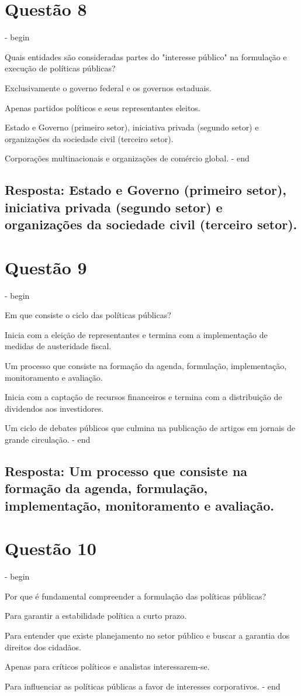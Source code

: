 \documentclass[
   article,       
   12pt,          
   oneside,       
   a4paper,       
   english,       
   brazil,        
   sumario=tradicional
   ]{abntex2}
\begin{document}
\section{Questão 8}
\itemize - begin
\item Quais entidades são consideradas partes do "interesse público" na formulação e execução de políticas públicas?
\item Exclusivamente o governo federal e os governos estaduais.
\item Apenas partidos políticos e seus representantes eleitos.
\item Estado e Governo (primeiro setor), iniciativa privada (segundo setor) e organizações da sociedade civil (terceiro setor).
\item Corporações multinacionais e organizações de comércio global.
\itemize - end
\subsection{Resposta: Estado e Governo (primeiro setor), iniciativa privada (segundo setor) e organizações da sociedade civil (terceiro setor).}

\section{Questão 9}
\itemize - begin
\item Em que consiste o ciclo das políticas públicas?
\item Inicia com a eleição de representantes e termina com a implementação de medidas de austeridade fiscal.
\item Um processo que consiste na formação da agenda, formulação, implementação, monitoramento e avaliação.
\item Inicia com a captação de recursos financeiros e termina com a distribuição de dividendos aos investidores.
\item Um ciclo de debates públicos que culmina na publicação de artigos em jornais de grande circulação.
\itemize - end
\subsection{Resposta: Um processo que consiste na formação da agenda, formulação, implementação, monitoramento e avaliação.}

\section{Questão 10}
\itemize - begin
\item Por que é fundamental compreender a formulação das políticas públicas?
\item Para garantir a estabilidade política a curto prazo.
\item Para entender que existe planejamento no setor público e buscar a garantia dos direitos dos cidadãos.
\item Apenas para críticos políticos e analistas interessarem-se.
\item Para influenciar as políticas públicas a favor de interesses corporativos.
\itemize - end
\end{document}
